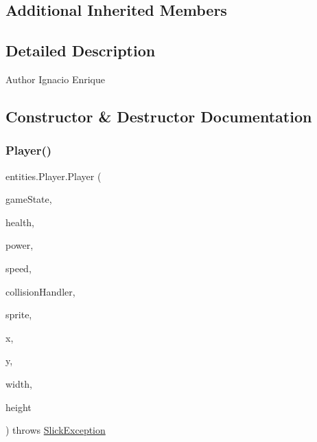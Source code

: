 \subsection*{Additional Inherited Members}


\subsection{Detailed Description}
\begin{DoxyAuthor}{Author}
Ignacio Enrique 
\end{DoxyAuthor}


\subsection{Constructor \& Destructor Documentation}
\mbox{\label{classentities_1_1_player_afb9d6ae0aa37d3b73420655ca2eb603b}} 
\subsubsection{\texorpdfstring{Player()}{Player()}}
{\footnotesize\ttfamily entities.\+Player.\+Player (\begin{DoxyParamCaption}\item[{\mbox{\hyperlink{classstates_1_1_game_state}{Game\+State}}}]{game\+State,  }\item[{int}]{health,  }\item[{int}]{power,  }\item[{int}]{speed,  }\item[{\mbox{\hyperlink{classentities_1_1_collision_handler}{Collision\+Handler}}}]{collision\+Handler,  }\item[{\mbox{\hyperlink{classorg_1_1newdawn_1_1slick_1_1_image}{Image}}}]{sprite,  }\item[{float}]{x,  }\item[{float}]{y,  }\item[{float}]{width,  }\item[{float}]{height }\end{DoxyParamCaption}) throws \mbox{\hyperlink{classorg_1_1newdawn_1_1slick_1_1_slick_exception}{Slick\+Exception}}\hspace{0.3cm}{\ttfamily [inline]}}


